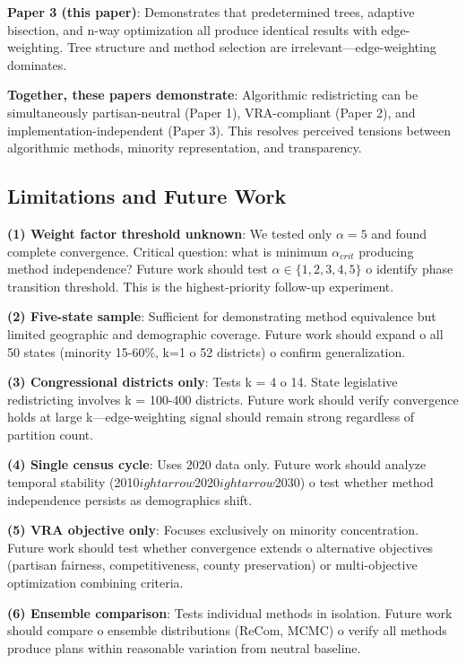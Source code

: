 \textbf{Paper 3 (this paper)}: Demonstrates that predetermined trees, adaptive bisection, and n-way optimization all produce identical results with edge-weighting. Tree structure and method selection are irrelevant—edge-weighting dominates.

\textbf{Together, these papers demonstrate}: Algorithmic redistricting can be simultaneously partisan-neutral (Paper 1), VRA-compliant (Paper 2), and implementation-independent (Paper 3). This resolves perceived tensions between algorithmic methods, minority representation, and transparency.

\subsection{Limitations and Future Work}

\textbf{(1) Weight factor threshold unknown}: We tested only $\alpha = 5$ and found complete convergence. Critical question: what is minimum $\alpha_{crit}$ producing method independence? Future work should test $\alpha \in \{1, 2, 3, 4, 5\}$ 	o identify phase transition threshold. This is the highest-priority follow-up experiment.

\textbf{(2) Five-state sample}: Sufficient for demonstrating method equivalence but limited geographic and demographic coverage. Future work should expand 	o all 50 states (minority 15-60\%, k=1 	o 52 districts) 	o confirm generalization.

\textbf{(3) Congressional districts only}: Tests k = 4 	o 14. State legislative redistricting involves k = 100-400 districts. Future work should verify convergence holds at large k—edge-weighting signal should remain strong regardless of partition count.

\textbf{(4) Single census cycle}: Uses 2020 data only. Future work should analyze temporal stability (2010$
ightarrow$2020$
ightarrow$2030) 	o test whether method independence persists as demographics shift.

\textbf{(5) VRA objective only}: Focuses exclusively on minority concentration. Future work should test whether convergence extends 	o alternative objectives (partisan fairness, competitiveness, county preservation) or multi-objective optimization combining criteria.

\textbf{(6) Ensemble comparison}: Tests individual methods in isolation. Future work should compare 	o ensemble distributions (ReCom, MCMC) 	o verify all methods produce plans within reasonable variation from neutral baseline.

